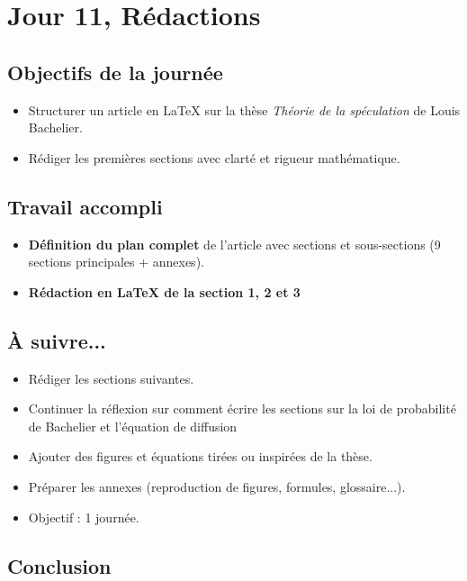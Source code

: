 \documentclass[a4paper,11pt]{article}
\begin{document}

\section{Jour 11, Rédactions}

\subsection{Objectifs de la journée}
\begin{itemize}
    \item Structurer un article en \LaTeX{} sur la thèse \textit{Théorie de la spéculation} de Louis Bachelier.
    \item Rédiger les premières sections avec clarté et rigueur mathématique.
\end{itemize}

\subsection{Travail accompli}
\begin{itemize}
    \item \textbf{Définition du plan complet} de l'article avec sections et sous-sections (9 sections principales + annexes).
    \item \textbf{Rédaction en \LaTeX{} de la section 1, 2 et 3}
\end{itemize}

\subsection{À suivre...}
\begin{itemize}
    \item Rédiger les sections suivantes.
    \item Continuer la réflexion sur comment écrire les sections sur la loi de probabilité de Bachelier et l’équation de diffusion 
    \item Ajouter des figures et équations tirées ou inspirées de la thèse.
    \item Préparer les annexes (reproduction de figures, formules, glossaire...).
    \item Objectif : 1 journée.
\end{itemize}

\subsection{Conclusion}
\end{document}
